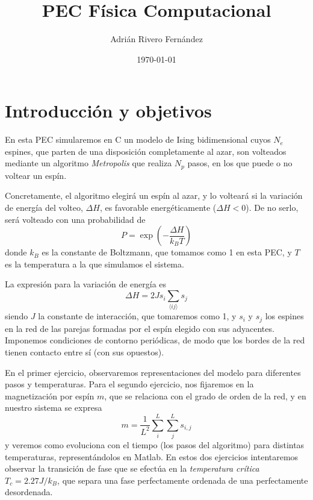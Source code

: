 \documentclass[a4paper,12pt,spanish]{article}
\begin{document}
	
	
	\title{PEC Física Computacional}
	
	\author{Adrián Rivero Fernández}
	\date{\today}
	
	\maketitle
	
	
	\section{Introducción y objetivos}
	

	En esta PEC simularemos en C un modelo de Ising bidimensional cuyos $N_e$ espines, que parten de una disposición completamente al azar, son volteados mediante un algoritmo \textit{Metropolis} que realiza $N_p$ pasos, en los que puede o no voltear un espín. 
	
	Concretamente, el algoritmo elegirá un espín al azar, y lo volteará si la variación de energía del volteo, $\Delta H$, es favorable energéticamente ($\Delta H < 0$). De no serlo, será volteado con una probabilidad de
	\[ P = \exp\left(-\frac{\Delta H}{k_B T}\right)
	\]
	donde $k_B$ es la constante de Boltzmann, que tomamos como 1 en esta PEC, y $T$ es la temperatura a la que simulamos el sistema.
	
	La expresión para la variación de energía es 
	\[\Delta H = 2 J s_i \sum_{\langle ij\rangle} s_j
	\]
	siendo $J$ la constante de interacción, que tomaremos como 1, y $s_i$ y $s_j$ los espines en la red de las parejas formadas por el espín elegido con sus adyacentes. Imponemos condiciones de contorno periódicas, de modo que los bordes de la red tienen contacto entre sí (con sus opuestos).
	
	En el primer ejercicio, observaremos representaciones del modelo para diferentes pasos y temperaturas. Para el segundo ejercicio, nos fijaremos en la magnetización por espín $m$, que se relaciona con el grado de orden de la red, y en nuestro sistema se expresa 
	\[ m = \frac{1}{L^2} \sum_{i}^{L}\sum_{j}^{L} s_{i,j}
	\]
	y veremos como evoluciona con el tiempo (los pasos del algoritmo) para distintas temperaturas, representándolos en Matlab. En estos dos ejercicios intentaremos observar la transición de fase que se efectúa en la \textit{temperatura crítica} $T_c = 2.27 J/k_B$, que separa una fase perfectamente ordenada de una perfectamente desordenada.
	
\end{document}
